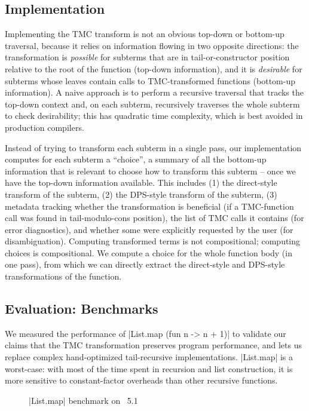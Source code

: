 \subsection{Implementation} \label{subsec:implementation} Implementing the TMC transform is not an obvious top-down or bottom-up traversal, because it relies on information flowing in two opposite directions: the transformation is \emph{possible} for subterms that are in tail-or-constructor position relative to the root of the function (top-down information), and it is \emph{desirable} for subterms whose leaves contain calls to TMC-transformed functions (bottom-up information). A naive approach is to perform a recursive traversal that tracks the top-down context and, on each subterm, recursively traverses the whole subterm to check desirability; this has quadratic time complexity, which is best avoided in production compilers.

Instead of trying to transform each subterm in a single pass, our implementation computes for each subterm a ``choice'', a summary of all the bottom-up information that is relevant to choose how to transform this subterm -- once we have the top-down information available. This includes (1) the direct-style transform of the subterm, (2) the DPS-style transform of the subterm, (3) metadata tracking whether the transformation is beneficial (if a TMC-function call was found in tail-modulo-cons position), the list of TMC calls it contains (for error diagnostics), and whether some were explicitly requested by the user (for disambiguation). Computing transformed terms is not compositional; computing choices is compositional. We compute a choice for the whole function body (in one pass), from which we can directly extract the direct-style and DPS-style transformations of the function.

\subsection{Evaluation: Benchmarks}

We measured the performance of \ocaml|List.map (fun n -> n + 1)| to validate our claims that the TMC transformation preserves program performance, and lets us replace complex hand-optimized tail-recursive implementations. \ocaml|List.map| is a worst-case: with most of the time spent in recursion and list construction, it is more sensitive to constant-factor overheads than other recursive functions.

\begin{figure}[tp]
\def\svgscale{0.8}
\graphicspath{{plots/}}

\caption{\ocaml|List.map| benchmark on \OCaml~5.1}
\label{fig:bench5}
\end{figure}

